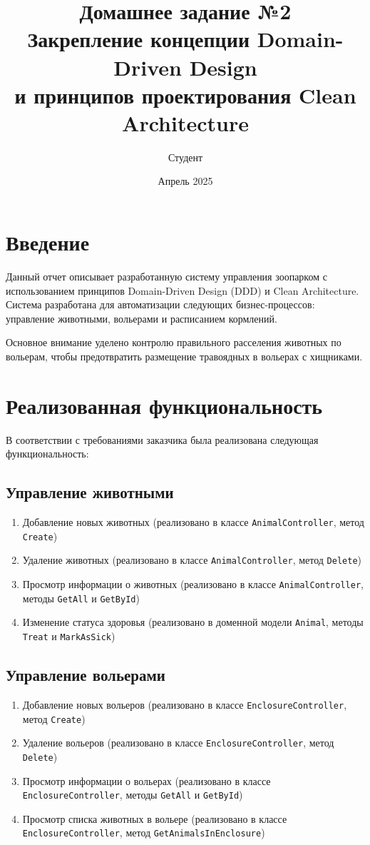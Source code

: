 \documentclass[a4paper,12pt]{article}
\title{Домашнее задание №2\\
Закрепление концепции Domain-Driven Design\\
и принципов проектирования Clean Architecture}
\author{Студент}
\date{Апрель 2025}
\begin{document}
\maketitle

\section{Введение}

Данный отчет описывает разработанную систему управления зоопарком с использованием принципов Domain-Driven Design (DDD) и Clean Architecture. Система разработана для автоматизации следующих бизнес-процессов: управление животными, вольерами и расписанием кормлений.

Основное внимание уделено контролю правильного расселения животных по вольерам, чтобы предотвратить размещение травоядных в вольерах с хищниками.

\section{Реализованная функциональность}

В соответствии с требованиями заказчика была реализована следующая функциональность:

\subsection{Управление животными}

\begin{enumerate}
    \item Добавление новых животных (реализовано в классе \texttt{AnimalController}, метод \texttt{Create})
    \item Удаление животных (реализовано в классе \texttt{AnimalController}, метод \texttt{Delete})
    \item Просмотр информации о животных (реализовано в классе \texttt{AnimalController}, методы \texttt{GetAll} и \texttt{GetById})
    \item Изменение статуса здоровья (реализовано в доменной модели \texttt{Animal}, методы \texttt{Treat} и \texttt{MarkAsSick})
\end{enumerate}

\subsection{Управление вольерами}

\begin{enumerate}
    \item Добавление новых вольеров (реализовано в классе \texttt{EnclosureController}, метод \texttt{Create})
    \item Удаление вольеров (реализовано в классе \texttt{EnclosureController}, метод \texttt{Delete})
    \item Просмотр информации о вольерах (реализовано в классе \texttt{EnclosureController}, методы \texttt{GetAll} и \texttt{GetById})
    \item Просмотр списка животных в вольере (реализовано в классе \texttt{EnclosureController}, метод \texttt{GetAnimalsInEnclosure})
\end{enumerate}
\end{document}
